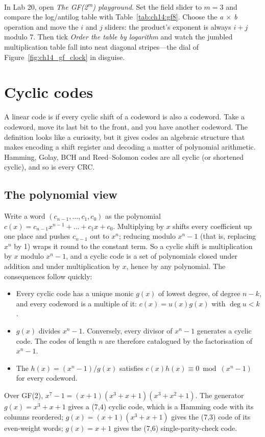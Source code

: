 \begin{tryit}
In Lab 20, open \emph{The GF(2\textsuperscript{m}) playground}. Set the field slider to $m=3$ and
compare the log/antilog table with Table~\ref{tab:ch14:gf8}. Choose the \emph{a $\times$ b}
operation and move the $i$ and $j$ sliders: the product's exponent is always $i+j$ modulo 7. Then tick
\emph{Order the table by logarithm} and watch the jumbled multiplication table fall into neat
diagonal stripes---the dial of Figure~\ref{fig:ch14_gf_clock} in disguise.
\end{tryit}

\section{Cyclic codes}
\label{sec:ch14:cyclic}

A linear code is  if every cyclic shift of a codeword is also a codeword. Take a
codeword, move its last bit to the front, and you have another codeword. The definition looks like a
curiosity, but it gives codes an algebraic structure that makes encoding a shift register and
decoding a matter of polynomial arithmetic. Hamming, Golay, BCH and Reed--Solomon codes are all cyclic
(or shortened cyclic), and so is every CRC.

\subsection{The polynomial view}

Write a word $(c_{n-1},\dots,c_1,c_0)$ as the polynomial $c(x)=c_{n-1}x^{n-1}+\dots+c_1x+c_0$.
Multiplying by $x$ shifts every coefficient up one place and pushes $c_{n-1}$ out to $x^n$;
reducing modulo $x^n-1$ (that is, replacing $x^n$ by 1) wraps it round to the constant term. So a
cyclic shift is multiplication by $x$ modulo $x^n-1$, and a cyclic code is a set of polynomials
closed under addition and under multiplication by $x$, hence by any polynomial. The consequences
follow quickly:
\begin{itemize}
\item Every cyclic code has a unique monic  $g(x)$ of lowest degree,
of degree $n-k$, and every codeword is a multiple of it: $c(x)=u(x)g(x)$ with $\deg u<k$.
\item $g(x)$ divides $x^n-1$. Conversely, every divisor of $x^n-1$ generates a cyclic code. The
codes of length $n$ are therefore catalogued by the factorisation of $x^n-1$.
\item The  $h(x)=(x^n-1)/g(x)$ satisfies $c(x)h(x)\equiv0\bmod
(x^n-1)$ for every codeword.
\end{itemize}
Over GF(2), $x^7-1=(x+1)(x^3+x+1)(x^3+x^2+1)$. The generator $g(x)=x^3+x+1$ gives a (7,4) cyclic
code, which is a Hamming code with its columns reordered; $g(x)=(x+1)(x^3+x+1)$ gives the (7,3)
code of its even-weight words; $g(x)=x+1$ gives the (7,6) single-parity-check code.

